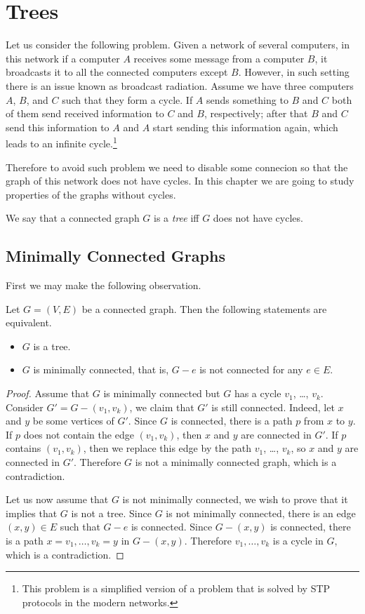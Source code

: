 \chapter{Trees}
\label{chapter:trees}
Let us consider the following problem. Given a network of several computers,
in this network if a computer $A$ receives some message from a computer $B$,
it broadcasts it to all the connected computers except $B$.
However, in such setting there is an issue known as broadcast radiation.
Assume we have three computers $A$, $B$, and $C$ such that they form a cycle.
If $A$ sends something to $B$ and $C$ both of them send received information to
$C$ and $B$, respectively; after that $B$ and $C$ send this information to $A$
and $A$ start sending this information again, which leads to an infinite
cycle.\footnote{%
  This problem is a simplified version of a problem that is solved by STP
  protocols in the modern networks.
}

Therefore to avoid such problem we need to disable some connecion so that the
graph of this network does not have cycles.
In this chapter we are going to study properties of the graphs without cycles.
\begin{definition}
  We say that a connected graph $G$ is a \emph{tree} iff $G$ does not have cycles.
\end{definition}

\section{Minimally Connected Graphs}
First we may make the following observation.
\begin{theorem}
  Let $G = (V, E)$ be a connected graph. Then the following statements are
  equivalent.
  \begin{itemize}
    \item $G$ is a tree.
    \item $G$ is minimally connected, that is, $G - e$ is not connected for any
      $e \in E$.
  \end{itemize}
\end{theorem}
\begin{proof}
  Assume that $G$ is minimally connected but $G$ has a cycle
  $v_1$, \dots, $v_k$. Consider $G' = G - (v_1, v_k)$, we claim that $G'$
  is still connected. Indeed, let $x$ and $y$ be some vertices of $G'$.
  Since $G$ is connected, there is a path $p$ from $x$ to $y$. If $p$ does not
  contain the edge $(v_1, v_k)$, then $x$ and $y$ are connected in $G'$. If
  $p$ contains $(v_1, v_k)$, then we replace this edge by the path $v_1$, \dots,
  $v_k$, so $x$ and $y$ are connected in $G'$. Therefore $G$ is not a minimally
  connected graph, which is a contradiction.

  Let us now assume that $G$ is not minimally connected, we wish to prove that
  it implies that $G$ is not a tree. Since $G$ is not minimally connected, there
  is an edge $(x, y) \in E$ such that $G - e$ is connected. Since $G - (x, y)$
  is connected, there is a path $x = v_1, \dots, v_k = y$ in $G - (x, y)$.
  Therefore $v_1, \dots, v_k$ is a cycle in $G$, which is a contradiction.
 \end{proof}


